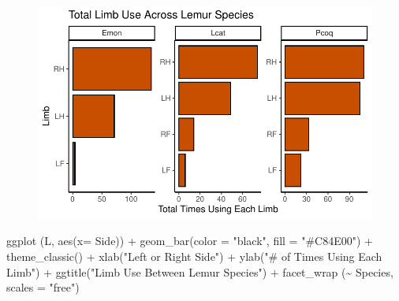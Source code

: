 \documentclass[
  letterpaper,
  DIV=11,
  numbers=noendperiod]{scrartcl}
\newenvironment{Shaded}{\begin{snugshade}}{\end{snugshade}}
\newcommand{\AttributeTok}[1]{\textcolor[rgb]{0.40,0.45,0.13}{#1}}
\newcommand{\FunctionTok}[1]{\textcolor[rgb]{0.28,0.35,0.67}{#1}}
\newcommand{\NormalTok}[1]{\textcolor[rgb]{0.00,0.23,0.31}{#1}}
\newcommand{\SpecialCharTok}[1]{\textcolor[rgb]{0.37,0.37,0.37}{#1}}
\newcommand{\StringTok}[1]{\textcolor[rgb]{0.13,0.47,0.30}{#1}}
\begin{document}
\begin{figure}[H]

{\centering \includegraphics{LeftyLemurs_files/figure-pdf/unnamed-chunk-16-1.pdf}

}

\end{figure}

\begin{Shaded}
\begin{Highlighting}[]
\FunctionTok{ggplot}\NormalTok{ (L, }\FunctionTok{aes}\NormalTok{(}\AttributeTok{x=}\NormalTok{ Side)) }\SpecialCharTok{+}
  \FunctionTok{geom\_bar}\NormalTok{(}\AttributeTok{color =} \StringTok{"black"}\NormalTok{, }\AttributeTok{fill =} \StringTok{"\#C84E00"}\NormalTok{) }\SpecialCharTok{+}
  \FunctionTok{theme\_classic}\NormalTok{() }\SpecialCharTok{+}
  \FunctionTok{xlab}\NormalTok{(}\StringTok{"Left or Right Side"}\NormalTok{) }\SpecialCharTok{+}
  \FunctionTok{ylab}\NormalTok{(}\StringTok{"\# of Times Using Each Limb"}\NormalTok{) }\SpecialCharTok{+}
  \FunctionTok{ggtitle}\NormalTok{(}\StringTok{"Limb Use Between Lemur Species"}\NormalTok{) }\SpecialCharTok{+}
  \FunctionTok{facet\_wrap}\NormalTok{ (}\SpecialCharTok{\textasciitilde{}}\NormalTok{ Species, }\AttributeTok{scales =} \StringTok{"free"}\NormalTok{)}
\end{Highlighting}
\end{Shaded}
\end{document}
